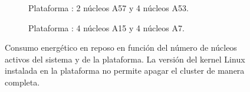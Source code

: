 \begin{figure}
  \centering
  \begin{subfigure}{0.9\textwidth}
    \centering
    \caption{Plataforma \juno: 2 núcleos \BIG A57 y 4 núcleos \LITTLE A53.}
      \label{}
    \end{subfigure}

    \vspace{0.5cm}

    \begin{subfigure}{0.9\textwidth}
      \centering
      \setlength{\fboxsep}{20pt} %
      \caption{Plataforma \odroid: 4 núcleos \BIG A15 y 4 núcleos \LITTLE A7.}
      \label{}
    \end{subfigure}  
    
  \caption[Consumo energético en función del número de cores activos en
  cada cluster]{Consumo energético en reposo en función del número de núcleos
    activos del sistema y de la plataforma. La versión del kernel Linux
    instalada en la plataforma \odroid no permite apagar el cluster
    \LITTLE de manera completa.}
  \label{s5:fig:apagadoCores}
\end{figure}

